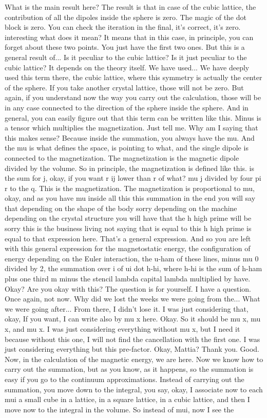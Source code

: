 What is the main result here? The result is that in case of the cubic lattice, the contribution of all the dipoles inside the sphere is zero. The magic of the dot block is zero. You can check the iteration in the final, it's correct, it's zero. interesting what does it mean? It means that in this case, in principle, you can forget about these two points. You just have the first two ones. But this is a general result of... Is it peculiar to the cubic lattice? Is it just peculiar to the cubic lattice? It depends on the theory itself. We have used... We have deeply used this term there, the cubic lattice, where this symmetry is actually the center of the sphere. If you take another crystal lattice, those will not be zero. But again, if you understand now the way you carry out the calculation, those will be in any case connected to the direction of the sphere inside the sphere. And in general, you can easily figure out that this term can be written like this. Minus is a tensor which multiplies the magnetization. Just tell me. Why am I saying that this makes sense? Because inside the summation, you always have the mu. And the mu is what defines the space, is pointing to what, and the single dipole is connected to the magnetization. The magnetization is the magnetic dipole divided by the volume. So in principle, the magnetization is defined like this. is the sum for j, okay, if you want r ij lower than r of what? mu j divided by four pi r to the q. This is the magnetization. The magnetization is proportional to mu, okay, and as you have mu inside all this this summation in the end you will say that depending on the shape of the body sorry depending on the machine depending on the crystal structure you will have that the h high prime will be sorry this is the business living not saying that is equal to this h high prime is equal to that expression here. That's a general expression. And so you are left with this general expression for the magnetostatic energy, the configuration of energy depending on the Euler interaction, the u-ham of these lines, minus mu 0 divided by 2, the summation over i of ui dot h-hi, where h-hi is the sum of h-ham plus one third m minus the stencil lambda capital lambda multiplied by have. Okay? Are you okay with this? The question is for yourself. I have a question. Once again, not now. Why did we lost the weeks we were going from the... What we were going after... From there, I didn't lose it. I was just considering that, okay, If you want, I can write also by mu x here. Okay. So it should be mu x, mu x, and mu x. I was just considering everything without mu x, but I need it because without this one, I will not find the cancellation with the first one. I was just considering everything but this pre-factor. Okay, Mattia? Thank you. Good. Now, in the calculation of the magnetic energy, we are here. Now we know how to carry out the summation, but as you know, as it happens, so the summation is easy if you go to the continuum approximations. Instead of carrying out the summation, you move down to the integral, you say, okay, I associate now to each mui a small cube in a lattice, in a square lattice, in a cubic lattice, and then I move now to the integral in the volume. So instead of mui, now I see the 